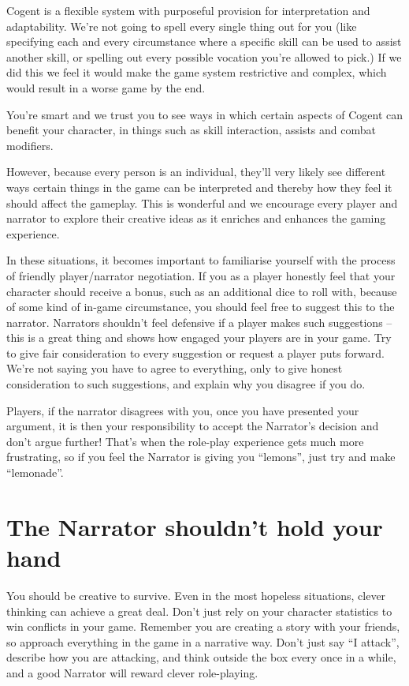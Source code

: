 Cogent is a flexible system with purposeful provision for interpretation and adaptability. We’re not going to spell every single thing out for you (like specifying each and every circumstance where a specific skill can be used to assist another skill, or spelling out every possible vocation you’re allowed to pick.) If we did this we feel it would make the game system restrictive and complex, which would result in a worse game by the end.

You’re smart and we trust you to see ways in which certain aspects of Cogent can benefit your character, in things such as skill interaction, assists and combat modifiers.

However, because every person is an individual, they’ll very likely see different ways certain things in the game can be interpreted and thereby how they feel it should affect the gameplay. This is wonderful and we encourage every player and narrator to explore their creative ideas as it enriches and enhances the gaming experience.

In these situations, it becomes important to familiarise yourself with the process of friendly player/narrator negotiation. If you as a player honestly feel that your character should receive a bonus, such as an additional dice to roll with, because of some kind of in-game circumstance, you should feel free to suggest this to the narrator. Narrators shouldn’t feel defensive if a player makes such suggestions – this is a great thing and shows how engaged your players are in your game. Try to give fair consideration to every suggestion or request a player puts forward. We’re not saying you have to agree to everything, only to give honest consideration to such suggestions, and explain why you disagree if you do.

Players, if the narrator disagrees with you, once you have presented your argument, it is then your responsibility to accept the Narrator's decision and don’t argue further! That’s when the role-play experience gets much more frustrating, so if you feel the Narrator is giving you “lemons”, just try and make “lemonade”.

\section{The Narrator shouldn't hold your hand} \label{sec:narrator_hold_hand}

You should be creative to survive. Even in the most hopeless situations, clever thinking can achieve a great deal. Don’t just rely on your character statistics to win conflicts in your game. Remember you are creating a story with your friends, so approach everything in the game in a narrative way. Don’t just say “I attack”, describe how you are attacking, and think outside the box every once in a while, and a good Narrator will reward clever role-playing.

